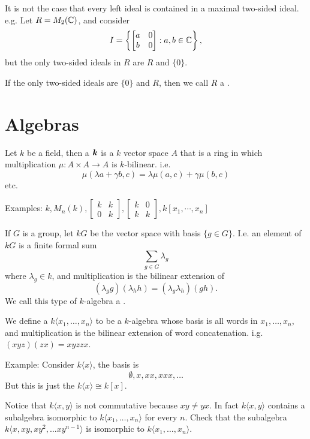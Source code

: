    It is not the case that every left ideal is contained in a
  maximal two-sided ideal. e.g. Let $R = M_2(\mathbb{C})$, and consider
  \[ I = \left\{ \begin{bmatrix} a & 0 \\ b & 0 \end{bmatrix} : a,b\in \mathbb{C} \right\}, \]
  but the only two-sided ideals in $R$ are $R$ and $\{0\}$.

  \begin{define}
    If the only two-sided ideals are $\{0\}$ and $R$, then we call $R$ a
    .
  \end{define}

\section{Algebras}

  \begin{define}
    Let $k$ be a field, then a $\boldsymbol{k}$ is a $k$ vector space $A$
    that is a ring in which multiplication $\mu: A \times A \to A$ is
    $k$-bilinear. i.e.
    \[\mu(\lambda a + \gamma b, c) = \lambda\mu(a,c) + \gamma\mu(b,c) \]
    etc.
  \end{define}

  Examples: $k, M_n(k), \begin{bmatrix} k & k \\ 0 & k \end{bmatrix},
    \begin{bmatrix} k & 0 \\ k & k \end{bmatrix}, k[x_1,\cdots,x_n]$

  \begin{define}
    If $G$ is a group, let $kG$ be the vector space with basis $\{g \in G\}$.
    I.e. an element of $kG$ is a finite formal sum
    \[ \sum_{g \in G} \lambda_g \]
    where $\lambda_g \in k$, and multiplication is the bilinear extension of
    \[ (\lambda_g g) (\lambda_h h) = (\lambda_g \lambda_h) (g h). \]
    We call this type of $k$-algebra a .
  \end{define}

  \begin{define}
    We define a  $k\langle x_1,\ldots,x_n\rangle$
    to be a $k$-algebra whose basis is all words in $x_1,\ldots,x_n$,
    and multiplication is the bilinear extension of word concatenation.
    i.g. $(xyz)(zx) = xyzzx$.
  \end{define}

  Example: Consider $k\langle x\rangle$, the basis is
  \[ \emptyset, x, xx, xxx, \ldots\]
  But this is just the $k\langle x \rangle \cong k[x]$.

  Notice that $k\langle x, y\rangle$ is not commutative because $xy \neq yx$.
  In fact $k\langle x, y\rangle$ contains a subalgebra isomorphic to
  $k\langle x_1, \ldots, x_n\rangle$ for every $n$. Check that the subalgebra
  $k\langle x, xy, xy^2, \ldots xy^{n-1} \rangle$ is isomorphic to
  $k\langle x_1, \ldots, x_n \rangle$.
